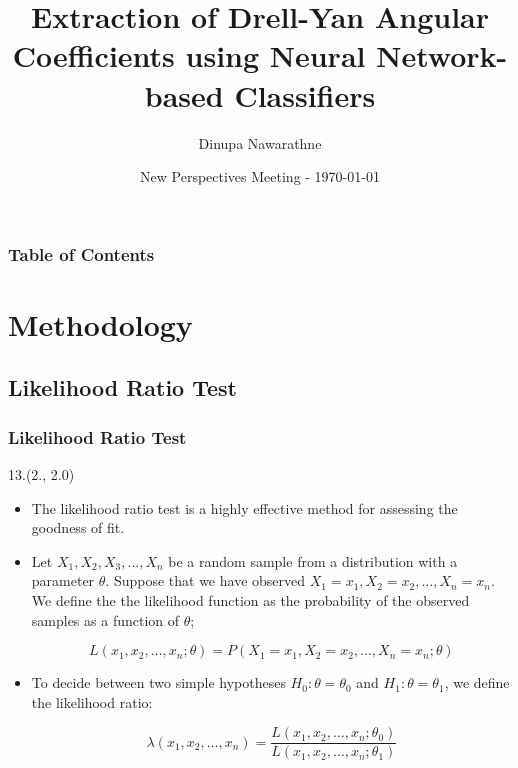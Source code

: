 \documentclass[12pt, xcolor={dvipsnames}, aspectratio = 169, sans,mathserif]{beamer}
\newenvironment{List}[2]
{\begin{textblock}{#1}#2
\begin{itemize}}
{\end{itemize}
\end{textblock}}
\begin{document}
\title{Extraction of Drell-Yan Angular Coefficients using Neural Network-based Classifiers}
\author{Dinupa Nawarathne}

\date{New Perspectives Meeting - \today}


\begin{frame}
  \maketitle
\end{frame}

\begin{frame}
\frametitle{Table of Contents}
\tableofcontents
\end{frame}

\section{Methodology}
\subsection{Likelihood Ratio Test}

\begin{frame}
\frametitle{Likelihood Ratio Test}

\begin{List}{13.}{(2., 2.0)}

  \item The likelihood ratio test is a highly effective method for assessing the goodness of fit.

  \item Let $X_1, X_2, X_3, \ldots, X_n$ be a random sample from a distribution with a parameter $\theta$. Suppose that
  we have observed $X_1 = x_1, X_2 = x_2, \ldots, X_n = x_n$. We define the the likelihood function as the probability of
  the observed samples as a function of $\theta$;

  \begin{equation*}
  L(x_1, x_2, \ldots, x_n; \theta) = P(X_1=x_1, X_2=x_2, \ldots, X_n=x_n; \theta)
  \end{equation*}

  \item To decide between two simple hypotheses $H_0: \theta = \theta_0$
  and $H_1: \theta = \theta_1$, we define the likelihood ratio:

  \begin{equation*}
  \lambda(x_1, x_2, \ldots, x_n) = \frac{L(x_1, x_2, \ldots, x_n; \theta_0)}{L(x_1, x_2, \ldots, x_n; \theta_1)}
  \end{equation*}

\end{List}

\end{frame}
\end{document}
